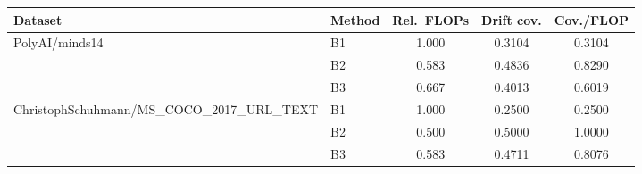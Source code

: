 \begin{tabular}{llccc}
\toprule
Dataset & Method & Rel.\ FLOPs & Drift cov. & Cov./FLOP \\
\midrule
PolyAI/minds14 & B1 & 1.000 & 0.3104 & 0.3104 \\
 & B2 & 0.583 & 0.4836 & 0.8290 \\
 & B3 & 0.667 & 0.4013 & 0.6019 \\
\midrule
ChristophSchuhmann/MS\_COCO\_2017\_URL\_TEXT & B1 & 1.000 & 0.2500 & 0.2500 \\
 & B2 & 0.500 & 0.5000 & 1.0000 \\
 & B3 & 0.583 & 0.4711 & 0.8076 \\
\bottomrule
\end{tabular}